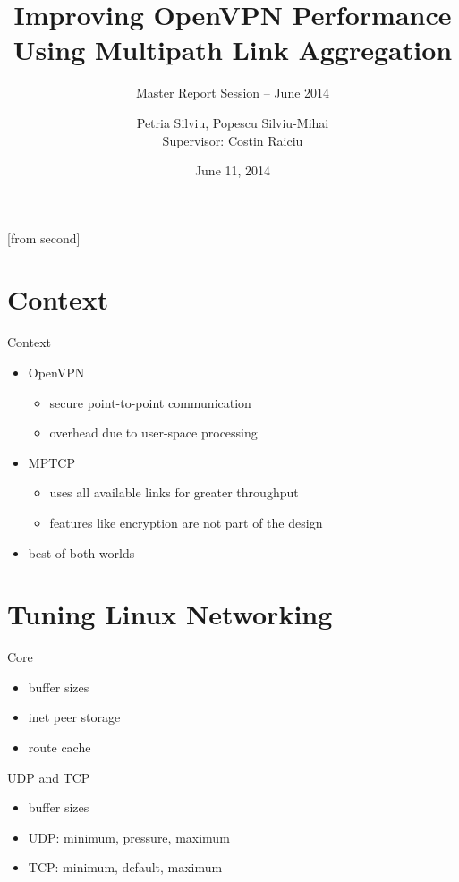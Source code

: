 \documentclass{beamer}
\title[Improving OpenVPN Performance Using Multipath Link
Aggregation]{Improving OpenVPN Performance Using Multipath Link Aggregation}
\subtitle{Master Report Session -- June 2014}
\institute{Faculty of Automatic Control and Computers,\\
	University POLITEHNICA of Bucharest}
\author[Petria Silviu, Popescu Silviu-Mihai]{Petria Silviu, Popescu
Silviu-Mihai\\
	Supervisor: Costin Raiciu}
\date{June 11, 2014}
\begin{document}
[from second]

\frame{\titlepage}

\section{Context}
\begin{frame}{Context}
  \begin{itemize}
    \item OpenVPN
    \begin{itemize}
      \item secure point-to-point communication
      \item overhead due to user-space processing
    \end{itemize}
    \item MPTCP
    \begin{itemize}
      \item uses all available links for greater throughput
      \item features like encryption are not part of the design
    \end{itemize}
    \item best of both worlds
  \end{itemize}
\end{frame}

\section{Tuning Linux Networking}
\begin{frame}{Core}
  \begin{itemize}
    \item buffer sizes
    \item inet peer storage
    \item route cache
  \end{itemize}
\end{frame}

\begin{frame}{UDP and TCP}
  \begin{itemize}
    \item buffer sizes
    \item UDP: minimum, pressure, maximum
    \item TCP: minimum, default, maximum
  \end{itemize}
\end{frame}
\end{document}
